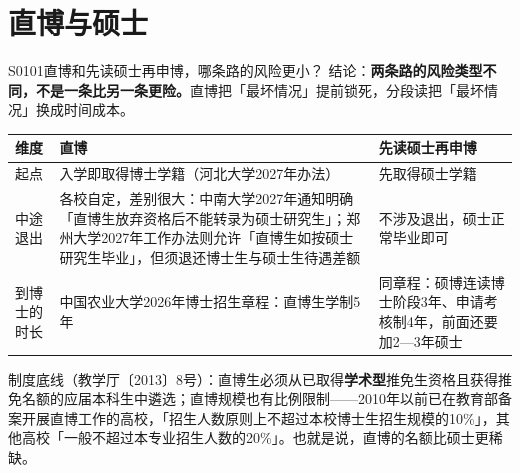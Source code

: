 \section{直博与硕士}
\begin{qa}{S0101}{直博和先读硕士再申博，哪条路的风险更小？}
结论：\textbf{两条路的风险类型不同，不是一条比另一条更险。}直博把「最坏情况」提前锁死，分段读把「最坏情况」换成时间成本。

\par\vspace{2pt}\nobreak\begin{center}\footnotesize
\begin{tabularx}{\textwidth}{>{\raggedright\arraybackslash}X>{\raggedright\arraybackslash}X>{\raggedright\arraybackslash}X}
\toprule
\textbf{维度} & \textbf{直博} & \textbf{先读硕士再申博} \\ \midrule
起点 & 入学即取得博士学籍（河北大学2027年办法） & 先取得硕士学籍 \\
中途退出 & 各校自定，差别很大：中南大学2027年通知明确「直博生放弃资格后不能转录为硕士研究生」；郑州大学2027年工作办法则允许「直博生如按硕士研究生毕业」，但须退还博士生与硕士生待遇差额 & 不涉及退出，硕士正常毕业即可 \\
到博士的时长 & 中国农业大学2026年博士招生章程：直博生学制5年 & 同章程：硕博连读博士阶段3年、申请考核制4年，前面还要加2—3年硕士 \\
\bottomrule
\end{tabularx}
\end{center}\vspace{2pt}\par

制度底线（教学厅〔2013〕8号）：直博生必须从已取得\textbf{学术型}推免生资格且获得推免名额的应届本科生中遴选；直博规模也有比例限制——2010年以前已在教育部备案开展直博工作的高校，「招生人数原则上不超过本校博士生招生规模的10\%」，其他高校「一般不超过本专业招生人数的20\%」。也就是说，直博的名额比硕士更稀缺。
\end{qa}

